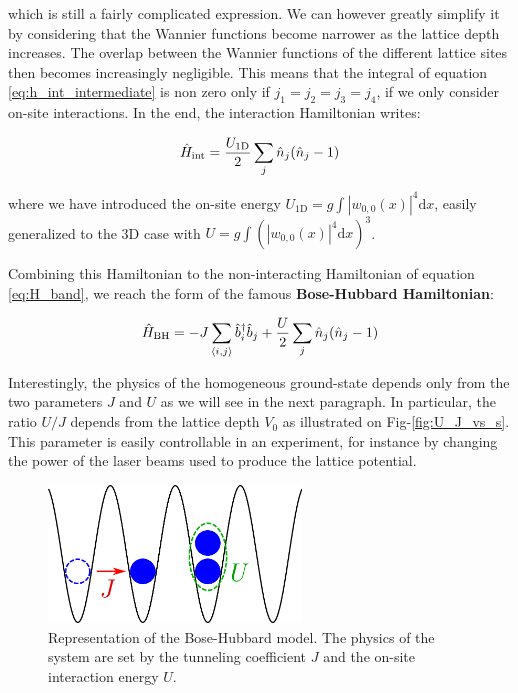 \noindent which is still a fairly complicated expression. We can however greatly simplify it by considering that the Wannier functions become narrower as the lattice depth increases. The overlap between the Wannier functions of the different lattice sites then becomes increasingly negligible. This means that the integral of equation \ref{eq:h_int_intermediate} is non zero only if $j_1=j_2=j_3=j_4$, \ie if we only consider on-site interactions. In the end, the interaction Hamiltonian writes:

\begin{equation}
    \hat{H}_{\rm{int}}=\frac{U_{\mathrm{1D}}}{2} \sum_j \hat{n}_j (\hat{n}_j -1)
\end{equation}

\noindent where we have introduced the on-site energy $U_{\mathrm{1D}}=g \int\left|w_{0,0}(x)\right|^{4} \mathrm{d}x$, easily generalized to the 3D case with $U=g \int(\left|w_{0,0}(x)\right|^{4} \mathrm{d}x)^3$. 

Combining this Hamiltonian to the non-interacting Hamiltonian of equation \ref{eq:H_band}, we reach the form of the famous \textbf{Bose-Hubbard Hamiltonian}:

\begin{equation}
    \hat{H}_{\mathrm{BH}}= -J \sum_{\left\langle i,j\right\rangle} \hat{b}^{\dagger}_i \hat{b}_j + \frac{U}{2} \sum_j \hat{n}_j (\hat{n}_j -1)
\end{equation}

\noindent Interestingly, the physics of the homogeneous ground-state depends only from the two parameters $J$ and $U$ as we will see in the next paragraph. In particular, the ratio $U/J$ depends from the lattice depth $V_0$ as illustrated on Fig-\ref{fig:U_J_vs_s}. This parameter is easily controllable in an experiment, for instance by changing the power of the laser beams used to produce the lattice potential.

\begin{figure}
    \centering
    \includegraphics[width=0.6\textwidth]{Fig/Chapter2/illu_bose_hubbard.png}
    \caption{Representation of the Bose-Hubbard model. The physics of the system are set by the tunneling coefficient $J$ and the on-site interaction energy $U$.}
    \label{fig:my_label}
\end{figure}

